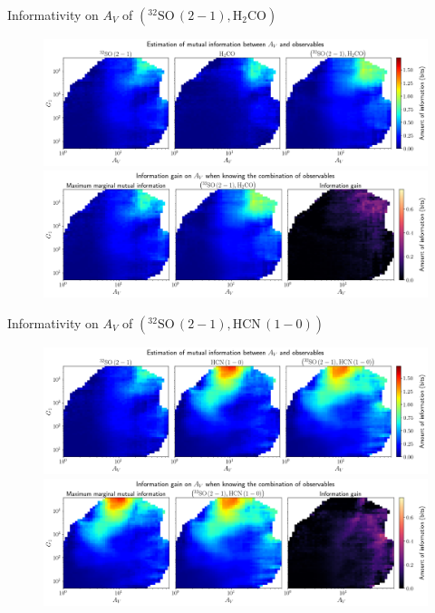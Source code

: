 \documentclass{beamer}
\begin{document}
\begin{frame}{Informativity on $A_V$ of $\left(\mathrm{^{32}SO\,(2-1)},\mathrm{H_2CO}\right)$}
    \begin{figure}
        \centering
        \includegraphics[width=0.95\linewidth]{../mi/av__32so21_h2co_mi.png}
        \vfill
        \includegraphics[width=0.95\linewidth]{../mi/av__32so21_h2co_mi_gain.png}
    \end{figure}
\end{frame}

\begin{frame}{Informativity on $A_V$ of $\left(\mathrm{^{32}SO\,(2-1)},\mathrm{HCN\,(1-0)}\right)$}
    \begin{figure}
        \centering
        \includegraphics[width=0.95\linewidth]{../mi/av__32so21_hcn10_mi.png}
        \vfill
        \includegraphics[width=0.95\linewidth]{../mi/av__32so21_hcn10_mi_gain.png}
    \end{figure}
\end{frame}
\end{document}

